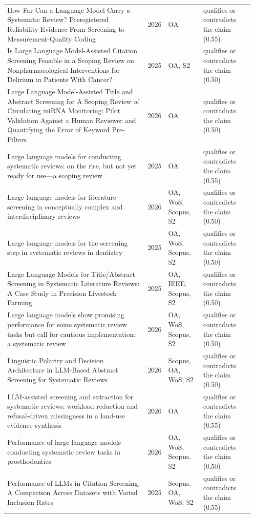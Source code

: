 \begin{longtable}{@{}%
  >{\raggedright\arraybackslash}p{}c%
  >{\raggedright\arraybackslash}p{}%
  >{\raggedright\arraybackslash}p{}@{}}
How Far Can a Language Model Carry a Systematic Review? Preregistered Reliability Evidence From Screening to Measurement-Quality Coding & 2026 & OA & qualifies or contradicts the claim (0.55) \\
Is Large Language Model-Assisted Citation Screening Feasible in a Scoping Review on Nonpharmacological Interventions for Delirium in Patients With Cancer? & 2025 & OA, S2 & qualifies or contradicts the claim (0.50) \\
Large Language Model-Assisted Title and Abstract Screening for A Scoping Review of Circulating miRNA Monitoring: Pilot Validation Against a Human Reviewer and Quantifying the Error of Keyword Pre-Filters & 2026 & OA & qualifies or contradicts the claim (0.50) \\
Large language models for conducting systematic reviews: on the rise, but not yet ready for use---a scoping review & 2025 & OA & qualifies or contradicts the claim (0.55) \\
Large language models for literature screening in conceptually complex and interdisciplinary reviews & 2026 & OA, WoS, Scopus, S2 & qualifies or contradicts the claim (0.50) \\
Large language models for the screening step in systematic reviews in dentistry & 2025 & OA, WoS, Scopus, S2 & qualifies or contradicts the claim (0.50) \\
Large Language Models for Title/Abstract Screening in Systematic Literature Reviews: A Case Study in Precision Livestock Farming & 2025 & OA, IEEE, Scopus, S2 & qualifies or contradicts the claim (0.50) \\
Large language models show promising performance for some systematic review tasks but call for cautious implementation: a systematic review & 2026 & OA, WoS, Scopus, S2 & qualifies or contradicts the claim (0.50) \\
Linguistic Polarity and Decision Architecture in LLM-Based Abstract Screening for Systematic Reviews & 2026 & Scopus, OA, WoS, S2 & qualifies or contradicts the claim (0.50) \\
LLM-assisted screening and extraction for systematic reviews: workload reduction and refusal-driven missingness in a land-use evidence synthesis & 2026 & OA & qualifies or contradicts the claim (0.55) \\
Performance of large language models conducting systematic review tasks in prosthodontics & 2026 & OA, WoS, Scopus, S2 & qualifies or contradicts the claim (0.50) \\
Performance of LLMs in Citation Screening: A Comparison Across Datasets with Varied Inclusion Rates & 2025 & Scopus, OA, WoS, S2 & qualifies or contradicts the claim (0.55) \\

\end{longtable}

